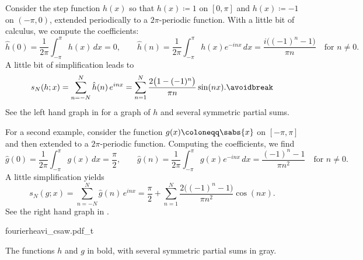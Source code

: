 \begin{example}
Consider the step function $h(x)$ so that $h(x) \coloneqq 1$
on $[0,\pi]$ and $h(x) \coloneqq -1$ on $(-\pi,0)$, extended periodically to a
$2\pi$-periodic function.  With a little bit of calculus,
we compute the coefficients:
\begin{equation*}
\hat{h}(0)
=
\frac{1}{2\pi} \int_{-\pi}^\pi h(x) \, dx = 0,
\qquad
\hat{h}(n)
=
\frac{1}{2\pi} \int_{-\pi}^\pi h(x) e^{-inx} \, dx
=
\frac{i\bigl( (-1)^n-1 \bigr)}{\pi n} \quad \text{for } n \neq 0 .
\end{equation*}
A little bit of simplification leads to
\begin{equation*}
s_N(h;x) =
\sum_{n=-N}^N \hat{h}(n) \,e^{inx} 
=
\sum_{n=1}^N \frac{2\bigl(1-(-1)^n\bigr)}{\pi n} \sin(n x) .
\avoidbreak
\end{equation*}
See the left hand graph in 
for a graph of $h$ and several symmetric partial sums.

For a second example, consider the function $g(x) \coloneqq \sabs{x}$
on $[-\pi,\pi]$ and then extended to a $2\pi$-periodic function.
Computing the coefficients, we find
\begin{equation*}
\hat{g}(0)
=
\frac{1}{2\pi} \int_{-\pi}^\pi g(x) \, dx = \frac{\pi}{2},
\qquad
\hat{g}(n)
=
\frac{1}{2\pi} \int_{-\pi}^\pi g(x) e^{-inx} \, dx
=
\frac{(-1)^n-1}{\pi n^2} \quad \text{for } n \neq 0 .
\end{equation*}
A little simplification yields
\begin{equation*}
s_N(g;x) =
\sum_{n=-N}^N \hat{g}(n) \,e^{inx} 
=
\frac{\pi}{2} + 
\sum_{n=1}^N \frac{2\bigl((-1)^n-1\bigr)}{\pi n^2} \cos(n x) .
\end{equation*}
See the right hand graph in .

\begin{myfigureht}
{fourierheavi_csaw.pdf_t}
\caption{The functions $h$ and $g$ in bold, with several
symmetric partial sums in gray.\label{fig:fourierheavicsaw}}
\end{myfigureht}


\end{example}

